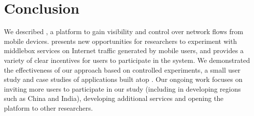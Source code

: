 \section{Conclusion}
\label{sec:conclusion}
We described \meddle, a platform to gain visibility and control over 
network flows from mobile devices. \meddle presents new opportunities for researchers 
to experiment with middlebox services on Internet traffic generated by mobile users, and 
provides a variety of clear incentives for users to participate in the system. We demonstrated 
the effectiveness of our approach based on controlled experiments, a small user study and 
case studies of applications built atop \meddle. Our ongoing work focuses on inviting more 
users to participate in our study (including in developing regions such as China and India), 
developing additional \meddlebox services and opening 
the platform to other researchers. 

